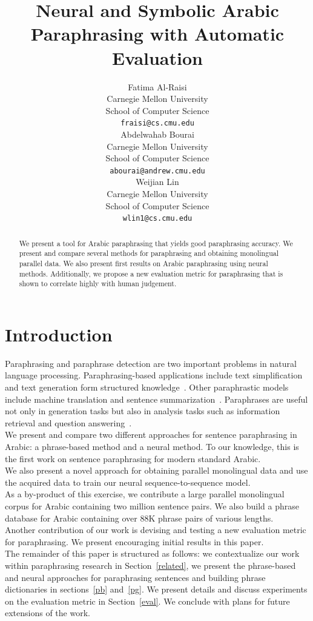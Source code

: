 \documentclass[11pt,letterpaper]{article}
\title{Neural and Symbolic Arabic Paraphrasing with Automatic Evaluation}
\author{Fatima Al-Raisi \\
 Carnegie Mellon University \\
  School of Computer Science \\
  {\tt fraisi@cs.cmu.edu} \\\And
 Abdelwahab Bourai\\
 Carnegie Mellon University \\
  School of Computer Science \\
  {\tt abourai@andrew.cmu.edu} \\\And
  Weijian Lin \\
 Carnegie Mellon University\\
 School of Computer Science \\ 
  {\tt wlin1@cs.cmu.edu} \\}
\date{}
\begin{document}
\maketitle
\begin{abstract}

	We present a tool for Arabic paraphrasing that yields good paraphrasing accuracy.  We present and compare several methods for paraphrasing and obtaining monolingual parallel data. We also present first results on Arabic paraphrasing using neural methods. Additionally, we propose a new evaluation metric for paraphrasing that is shown to correlate highly with human judgement.
\end{abstract}


\section{Introduction}
Paraphrasing and paraphrase detection are two important problems in natural language processing. Paraphrasing-based applications include text simplification and text generation form structured knowledge~\cite{parasimple}. Other paraphrastic models include machine translation and sentence summarization~\cite{app1,app2,app3}. Paraphrases are useful not only in generation tasks but also in analysis tasks such as information retrieval and question answering~\cite{app4,app5,app6}.\\
We present and compare two different approaches for sentence paraphrasing in Arabic: a phrase-based method and a neural method. To our knowledge, this is the first work on sentence paraphrasing for modern standard Arabic.\\ 
We also present a novel approach for obtaining parallel monolingual data and use the acquired data to train our neural sequence-to-sequence model.\\ 
As a by-product of this exercise, we contribute a large parallel monolingual corpus for Arabic containing two million sentence pairs. We also build a phrase database for Arabic containing over 88K phrase pairs of various lengths.\\ 
Another contribution of our work is devising and testing a new evaluation metric for paraphrasing. We present encouraging initial results in this paper.\\
The remainder of this paper is structured as follows: we contextualize our work within paraphrasing research in Section~\ref{related}, we present the phrase-based and neural approaches for paraphrasing sentences and building phrase dictionaries in sections~\ref{pb} and~\ref{pg}. We present details and discuss  experiments on the evaluation metric in Section~\ref{eval}. We conclude with plans for future extensions of the work.
\end{document}
